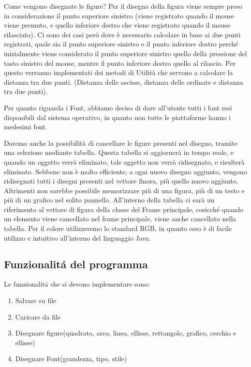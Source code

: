 \documentclass[a4paper,12pt]{article}
\begin{document}
Come vengono disegnate le figure?
Per il disegno della figura viene sempre preso in considerazione il punto superiore sinistro (viene registrato quando il mouse viene premuto, e quello inferiore destro che viene registrato quando il mouse rilasciato).
Ci sono dei casi però dove è necessario calcolare in base ai due punti registrati, quale sia il punto superiore sinistro e il punto inferiore destro perché inizialmente viene considerato il punto superiore sinistro quello della pressione del tasto sinistro del mouse, mentre il punto inferiore destro quello al rilascio.
Per questo verranno implementati dei metodi di Utilità che servono a calcolare la distanza tra due punti. (Distanza delle ascisse, distanza delle ordinate e distanza tra due punti).

Per quanto riguarda i Font, abbiamo deciso di dare all’utente tutti i font resi disponibili dal sistema operativo, in quanto non tutte le piattaforme hanno i medesimi font.

Daremo anche la possibilità di cancellare le figure presenti nel disegno, tramite una selezione mediante tabella.
Questa tabella si aggiornerà in tempo reale, e quando un oggetto verrà eliminato, tale oggetto non verrà ridisegnato, e risulterà eliminato.
Sebbene non è molto efficiente, a ogni nuovo disegno aggiunto, vengono ridisegnati tutti i disegni presenti nel vettore finora, più quello nuovo aggiunto.
Altrimenti non sarebbe possibile memorizzare più di una figura, più di un testo e più di un grafico nel solito pannello.
All’interno della tabella ci sarà un riferimento al vettore di figura della classe del Frame principale, cosicché quando un elemento viene cancellato nel frame principale, viene anche cancellato nella tabella.
Per il colore utilizzeremo lo standard RGB, in quanto esso è di facile utilizzo e intuitivo all’interno del linguaggio Java.


\subsection{Funzionalitá del programma}
Le funzionalitá che si devono implementare sono:
\begin{enumerate}
	\item Salvare su file
	\item Caricare da file
	\item Disegnare figure(quadrato, arco, linea, ellisse, rettangolo, grafico, cerchio e ellisse)
	\item Disegnare Font(grandezza, tipo,  stile)
\end{enumerate}
\clearpage
\end{document}
